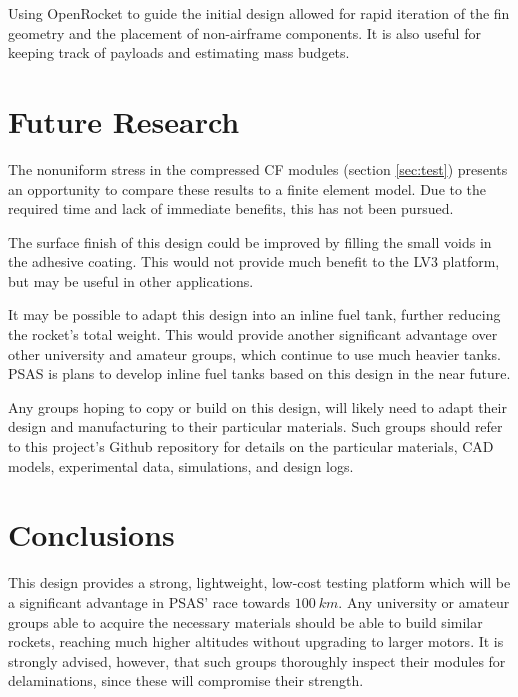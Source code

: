 \documentclass{aiaa-tc}%
\begin{document}
Using OpenRocket to guide the initial design allowed for rapid iteration of the fin geometry and the placement of non-airframe components. 
It is also useful for keeping track of payloads and estimating mass budgets.

\section{Future Research}

The nonuniform stress in the compressed CF modules (section \ref{sec:test}) presents an opportunity to compare these results to a finite element model. 
Due to the required time and lack of immediate benefits, this has not been pursued.

The surface finish of this design could be improved by filling the small voids in the adhesive coating. 
This would not provide much benefit to the LV3 platform, but may be useful in other applications.

It may be possible to adapt this design into an inline fuel tank, further reducing the rocket's total weight.
This would provide another significant advantage over other university and amateur groups, which continue to use much heavier tanks.
PSAS is plans to develop inline fuel tanks based on this design in the near future. 

Any groups hoping to copy or build on this design, will likely need to adapt their design and manufacturing to their particular materials. 
Such groups should refer to this project's Github repository\cite{LV3repo} for details on the particular materials, CAD models, experimental data, simulations, and design logs.


\section{Conclusions}

This design provides a strong, lightweight, low-cost testing platform which will be a significant advantage in PSAS' race towards $\SI{100}{km}$.
Any university or amateur groups able to acquire the necessary materials should be able to build similar rockets, reaching much higher altitudes without upgrading to larger motors. 
It is strongly advised, however, that such groups thoroughly inspect their modules for delaminations, since these will compromise their strength. 
\end{document}
